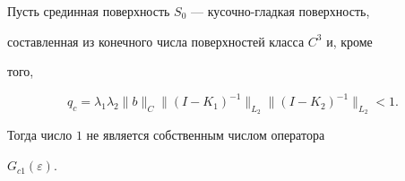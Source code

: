  


\begin{lem} 


Пусть срединная поверхность $S_0$ --- кусочно-гладкая поверхность, 


составленная из конечного числа поверхностей класса $C^3$ и, кроме 


того, 


\begin{equation} 


q_c=\lambda_1\lambda_2\|b\|_C\|(I-K_1)^{-1}\|_{L_2} 


\|(I-K_2)^{-1}\|_{L_2}<1. 


\end{equation} 


Тогда число $1$ не является собственным числом оператора 


$G_{c1}(\varepsilon)$. 


\end{lem}


 


